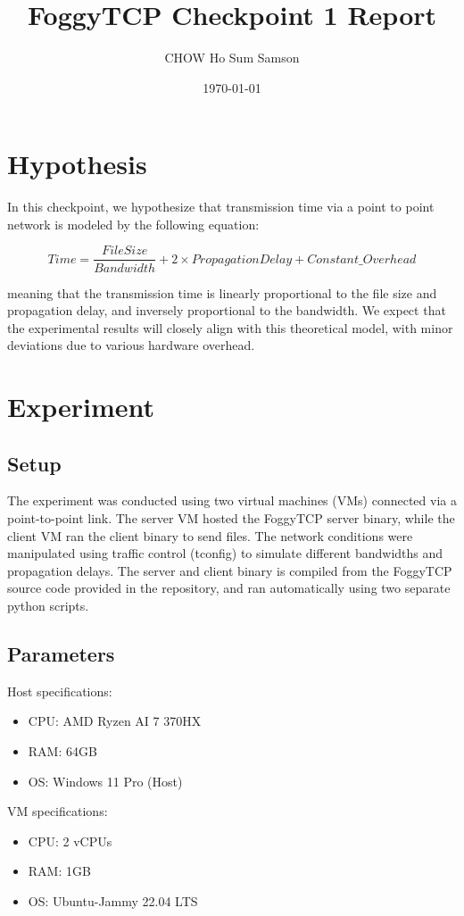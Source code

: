 \documentclass[11pt,letterpaper]{article}
\title{FoggyTCP Checkpoint 1 Report}
\author{CHOW Ho Sum Samson}
\date{\today}
\begin{document}
\maketitle

\section{Hypothesis}

In this checkpoint, we hypothesize that transmission time via a point to point 
network is modeled by the following equation:

\begin{equation}
    Time = \frac{File Size}{Bandwidth} + 2 \times Propagation Delay + Constant\_Overhead
\end{equation}

meaning that the transmission time is linearly proportional to the file size and propagation delay,
 and inversely proportional to the bandwidth.
  We expect that the experimental results will closely align with this theoretical model,
   with minor deviations due to various hardware overhead.



\section{Experiment}    
\subsection{Setup}
The experiment was conducted using two virtual machines (VMs) connected via a point-to-point link.
 The server VM hosted the FoggyTCP server binary, while the client VM ran the client binary to send files.
  The network conditions were manipulated using traffic control (tconfig) to simulate different bandwidths and propagation delays.
    The server and client binary is compiled from the FoggyTCP source code provided in the repository,
     and ran automatically using two separate python scripts.

\subsection{Parameters}
Host specifications:
\begin{itemize}
    \item CPU: AMD Ryzen AI 7 370HX
    \item RAM: 64GB
    \item OS: Windows 11 Pro (Host)
\end{itemize}
VM specifications:
\begin{itemize}
    \item CPU: 2 vCPUs
    \item RAM: 1GB
    \item OS: Ubuntu-Jammy 22.04 LTS
\end{itemize}
\end{document}
